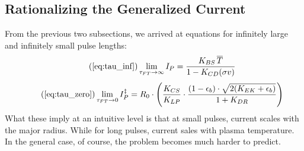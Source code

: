 \subsection{Rationalizing the Generalized Current}

From the previous two subsections, we arrived at equations for infinitely large and infinitely small pulse lengths:
\begin{equation}
	\tag{\ref{eq:tau_inf}}
	\lim_{\tau_{FT} \to \infty} I_P = \frac{ K_{BS} \, \overline T }{ 1 - K_{CD} ( \sigma v ) }
\end{equation}
\begin{equation}
	\tag{\ref{eq:tau_zero}}
	\lim_{ \tau_{FT} \to 0 } I_P^\ddagger = R_0 \cdot \left( \frac{ K_{CS} }{ K_{LP} } \cdot \frac{ ( 1 - \epsilon_b ) \cdot \sqrt{ 2 ( K_{EK} + \epsilon_b ) } }{ 1 + K_{DR} } \right)
\end{equation}
What these imply at an intuitive level is that at small pulses, current scales with the major radius. While for long pulses, current sales with plasma temperature. In the general case, of course, the problem becomes much harder to predict.

%
